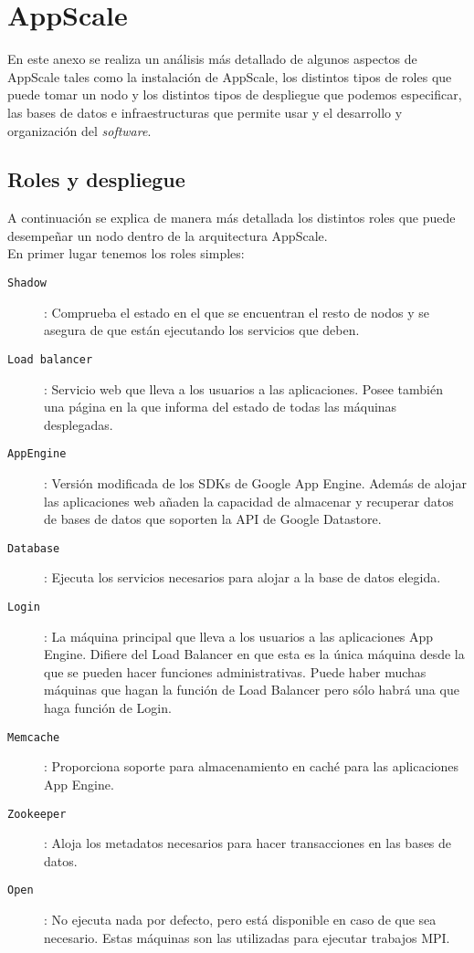 \chapter{AppScale}
\label{anx:appscale}


En este anexo se realiza un análisis más detallado de algunos aspectos de AppScale tales como la instalación de AppScale, los distintos tipos de roles que puede tomar un nodo y los distintos tipos de despliegue que podemos especificar, las bases de datos e infraestructuras que permite usar y el desarrollo y organización del \emph{software}.


\section{Roles y despliegue}
\label{anx:appscale-roles}

A continuación se explica de manera más detallada los distintos roles que puede desempeñar un nodo dentro de la arquitectura AppScale. \\

En primer lugar tenemos los roles simples:

\begin{description}
\item[\texttt{Shadow}]: Comprueba el estado en el que se encuentran el resto de nodos y se asegura de que están ejecutando los servicios que deben.
\item[\texttt{Load balancer}]: Servicio web que lleva a los usuarios a las aplicaciones. Posee también una página en la que informa del estado de todas las máquinas desplegadas.
\item[\texttt{AppEngine}]: Versión modificada de los SDKs de Google App Engine. Además de alojar las aplicaciones web añaden la capacidad de almacenar y recuperar datos de bases de datos que soporten la API de Google Datastore.
\item[\texttt{Database}]: Ejecuta los servicios necesarios para alojar a la base de datos elegida.
\item[\texttt{Login}]: La máquina principal que lleva a los usuarios a las aplicaciones App Engine. Difiere del Load Balancer en que esta es la única máquina desde la que se pueden hacer funciones administrativas. Puede haber muchas máquinas que hagan la función de Load Balancer pero sólo habrá una que haga función de Login.
\item[\texttt{Memcache}]: Proporciona soporte para almacenamiento en caché para las aplicaciones App Engine.
\item[\texttt{Zookeeper}]: Aloja los metadatos necesarios para hacer transacciones en las bases de datos.
\item[\texttt{Open}]: No ejecuta nada por defecto, pero está disponible en caso de que sea necesario. Estas máquinas son las utilizadas para ejecutar trabajos MPI.
\end{description}

